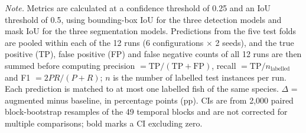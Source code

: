 \begin{table}[htbp]
    \centering
    \caption[Precision, recall and F1 for the focus species before and after copy-paste augmentation]{Precision, recall and F1-score for the three focus species before and after targeted copy-paste augmentation, aggregated over the six YOLO26 configurations and two training seeds.}
    \label{tab:focus_prf}
    \small
    \setlength{\tabcolsep}{4pt}
    \renewcommand{\arraystretch}{1.25}

    \vspace{3pt}
    \begin{minipage}{\linewidth}
    \footnotesize\textit{Note.} Metrics are calculated at a confidence threshold of 0.25 and an IoU threshold of 0.5,
    using bounding-box IoU for the three detection models and mask IoU for the three segmentation models. Predictions
    from the five test folds are pooled within each of the 12 runs (6 configurations $\times$ 2 seeds), and the true
    positive (TP), false positive (FP) and false negative counts of all 12 runs are then summed before computing
    precision $= \text{TP}/(\text{TP}+\text{FP})$, recall $= \text{TP}/n_{\text{labelled}}$ and F1 $= 2PR/(P+R)$; $n$ is the
    number of labelled test instances per run. Each prediction is matched to at most one labelled fish of the same species.
    $\Delta$ = augmented minus baseline, in percentage points (pp). CIs are from 2,000 paired block-bootstrap resamples
    of the 49 temporal blocks and are not corrected for multiple comparisons; bold marks a CI excluding zero.
    \end{minipage}
\end{table}
